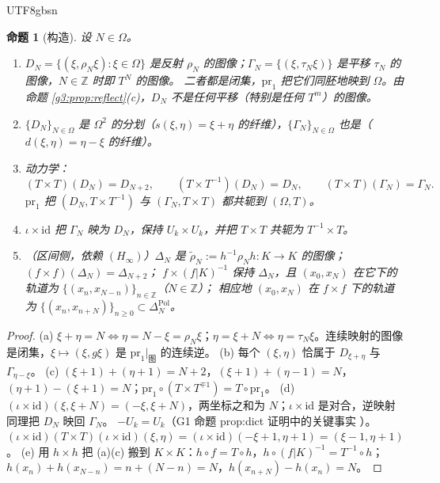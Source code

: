 \documentclass[11pt,a4paper]{article}
\newcommand{\status}[1]{\par\noindent\fbox{\textbf{状态：#1}}\par\smallskip}
\newcommand{\Om}{\Omega}               %
\newcommand{\pr}{\mathrm{pr}}
\theoremstyle{plain}
\newtheorem{prop}{命题}
\theoremstyle{definition}
\begin{document}
\begin{CJK}{UTF8}{gbsn}
\begin{prop}[构造]\label{g3:prop:construct}
设 $N\in\Om$。
\begin{enumerate}[label=(\alph*)]
\item $D_N=\{(\xi,\rho_N\xi):\xi\in\Om\}$ 是反射 $\rho_N$ 的图像；$\Gamma_N=\{(\xi,\tau_N\xi)\}$ 是平移 $\tau_N$ 的图像，$N\in\mathbb Z$ 时即 $T^N$ 的图像。
二者都是闭集，$\pr_1$ 把它们同胚地映到 $\Om$。由命题 \ref{g3:prop:reflect}(c)，$D_N$ \emph{不是}任何平移（特别是任何 $T^m$）的图像。
\item $\{D_N\}_{N\in\Om}$ 是 $\Om^2$ 的分划（$s(\xi,\eta)=\xi+\eta$ 的纤维），$\{\Gamma_N\}_{N\in\Om}$ 也是（$d(\xi,\eta)=\eta-\xi$ 的纤维）。
\item 动力学：
\[
(T\times T)(D_N)=D_{N+2},\qquad (T\times T^{-1})(D_N)=D_N,\qquad (T\times T)(\Gamma_N)=\Gamma_N .
\]
$\pr_1$ 把 $(D_N,T\times T^{-1})$ 与 $(\Gamma_N,T\times T)$ 都共轭到 $(\Om,T)$。
\item $\iota\times\mathrm{id}$ 把 $\Gamma_N$ 映为 $D_N$，保持 $U_k\times U_k$，并把 $T\times T$ 共轭为 $T^{-1}\times T$。
\item（区间侧，依赖 $(H_\infty)$）$\Delta_N$ 是 $\tilde\rho_N:=h^{-1}\rho_Nh:K\to K$ 的图像；$(f\times f)(\Delta_N)=\Delta_{N+2}$；
$f\times(f|K)^{-1}$ 保持 $\Delta_N$，且 $(x_0,x_N)$ 在它下的轨道为 $\{(x_n,x_{N-n})\}_{n\in\mathbb Z}$（$N\in\mathbb Z$）；
相应地 $(x_0,x_N)$ 在 $f\times f$ 下的轨道为 $\{(x_n,x_{n+N})\}_{n\ge0}\subset\Delta_N^{\mathrm{Pol}}$。
\end{enumerate}
\end{prop}
\status{已证（(a)--(d) 无条件；(e) 依赖假设 \ref{g3:hyp:infinite}）}
\begin{proof}
(a) $\xi+\eta=N\iff\eta=N-\xi=\rho_N\xi$；$\eta=\xi+N\iff\eta=\tau_N\xi$。连续映射的图像是闭集，$\xi\mapsto(\xi,g\xi)$ 是 $\pr_1|_{\text{图}}$ 的连续逆。
(b) 每个 $(\xi,\eta)$ 恰属于 $D_{\xi+\eta}$ 与 $\Gamma_{\eta-\xi}$。
(c) $(\xi+1)+(\eta+1)=N+2$，$(\xi+1)+(\eta-1)=N$，$(\eta+1)-(\xi+1)=N$；$\pr_1\circ(T\times T^{\mp1})=T\circ\pr_1$。
(d) $(\iota\times\mathrm{id})(\xi,\xi+N)=(-\xi,\xi+N)$，两坐标之和为 $N$；$\iota\times\mathrm{id}$ 是对合，逆映射同理把 $D_N$ 映回 $\Gamma_N$。
$-U_k=U_k$（G1 命题 prop:dict 证明中的关键事实 \cite{G1}）。$(\iota\times\mathrm{id})(T\times T)(\iota\times\mathrm{id})(\xi,\eta)=(\iota\times\mathrm{id})(-\xi+1,\eta+1)=(\xi-1,\eta+1)$。
(e) 用 $h\times h$ 把 (a)(c) 搬到 $K\times K$：$h\circ f=T\circ h$，$h\circ(f|K)^{-1}=T^{-1}\circ h$；$h(x_n)+h(x_{N-n})=n+(N-n)=N$，$h(x_{n+N})-h(x_n)=N$。
\end{proof}


\end{CJK}
\end{document}
